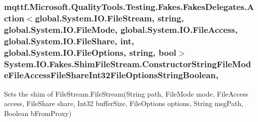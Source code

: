 \hypertarget{class_system_1_1_i_o_1_1_fakes_1_1_shim_file_stream_ac68b9377f47615f68a21d93825db5c8b}{
\subsubsection[{Constructor\-String\-File\-Mode\-File\-Access\-File\-Share\-Int32\-File\-Options\-String\-Boolean}]{\setlength{\rightskip}{0pt plus 5cm}mqttf.\-Microsoft.\-Quality\-Tools.\-Testing.\-Fakes.\-Fakes\-Delegates.\-Action$<$global.\-System.\-I\-O.\-File\-Stream, string, global.\-System.\-I\-O.\-File\-Mode, global.\-System.\-I\-O.\-File\-Access, global.\-System.\-I\-O.\-File\-Share, int, global.\-System.\-I\-O.\-File\-Options, string, bool$>$ System.\-I\-O.\-Fakes.\-Shim\-File\-Stream.\-Constructor\-String\-File\-Mode\-File\-Access\-File\-Share\-Int32\-File\-Options\-String\-Boolean\hspace{0.3cm}{\ttfamily [static]}, {\ttfamily [set]}}}\label{class_system_1_1_i_o_1_1_fakes_1_1_shim_file_stream_ac68b9377f47615f68a21d93825db5c8b}


Sets the shim of File\-Stream.\-File\-Stream(\-String path, File\-Mode mode, File\-Access access, File\-Share share, Int32 buffer\-Size, File\-Options options, String msg\-Path, Boolean b\-From\-Proxy)


